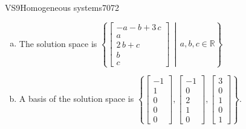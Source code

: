 \begin{exercise}{VS9}{Homogeneous systems}{7072}
\begin{exerciseAnswer}
\begin{enumerate}[(a)]
\item The solution space is \( \left\{ \left[\begin{array}{c}
-a - b + 3 \, c \\
a \\
2 \, b + c \\
b \\
c
\end{array}\right] \,\middle|\, a,b,c \in\mathbb R \right\} \) 
\item A basis of the solution space is \(\left\{ \left[\begin{array}{c}
-1 \\
1 \\
0 \\
0 \\
0
\end{array}\right] , \left[\begin{array}{c}
-1 \\
0 \\
2 \\
1 \\
0
\end{array}\right] , \left[\begin{array}{c}
3 \\
0 \\
1 \\
0 \\
1
\end{array}\right] \right\}\).
\end{enumerate}

     \end{exerciseAnswer}
 \end{exercise}



